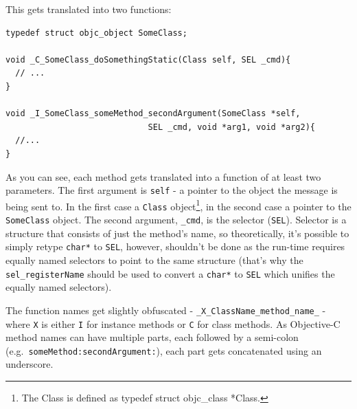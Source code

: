 This gets translated into two functions:

\begin{verbatim}
typedef struct objc_object SomeClass;

void _C_SomeClass_doSomethingStatic(Class self, SEL _cmd){
  // ...
}

void _I_SomeClass_someMethod_secondArgument(SomeClass *self,
                             SEL _cmd, void *arg1, void *arg2){
  //...
}
\end{verbatim}

As you can see, each method gets translated into a function of at least two parameters. The first argument is \verb=self= - a pointer to the object the message is being sent to. In the first case a \verb=Class= object\footnote{The Class is defined as typedef struct objc\_class *Class.}, in the second case a pointer to the \verb=SomeClass= object. The second argument, \verb=_cmd=, is the selector (\verb=SEL=). Selector is a structure that consists of just the method's name, so theoretically, it's possible to simply retype \verb=char*= to \verb=SEL=, however, shouldn't be done as the run-time requires equally named selectors to point to the same structure (that's why the \verb=sel_registerName= should be used to convert a \verb=char*= to \verb=SEL= which unifies the equally named selectors).

The function names get slightly obfuscated - \verb=_X_ClassName_method_name_= - where \verb=X= is either \verb=I= for instance methods or \verb=C= for class methods. As Objective-C method names can have multiple parts, each followed by a semi-colon (e.g.\ \verb=someMethod:secondArgument:=), each part gets concatenated using an underscore.
